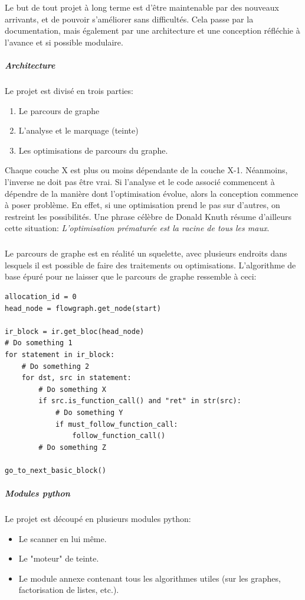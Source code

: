 Le but de tout projet à long terme est d'être maintenable par des nouveaux arrivants, et de pouvoir s'améliorer
sans difficultés. Cela passe par la documentation, mais également par une architecture et une conception réfléchie à l'avance
et si possible modulaire.
\subparagraph{Architecture}
Le projet est divisé en trois parties:
\begin{enumerate}
        \item Le parcours de graphe
        \item L'analyse et le marquage (teinte)
        \item Les optimisations de parcours du graphe.
\end{enumerate}
Chaque couche X est plus ou moins dépendante de la couche X-1. Néanmoins, l'inverse ne doit pas être vrai.
Si l'analyse et le code associé commencent à dépendre de la manière dont l'optimisation évolue, alors la conception commence à poser problème.
En effet, si une optimisation prend le pas sur d'autres, on restreint les possibilités. Une phrase célèbre de Donald Knuth résume d'ailleurs cette situation:
\textit{L'optimisation prématurée est la racine de tous les maux}.
\subparagraph{}
Le parcours de graphe est en réalité un squelette, avec plusieurs endroits dans lesquels il est possible de faire des traitements ou optimisations. L'algorithme de base
épuré pour ne laisser que le parcours de graphe ressemble à ceci:
\begin {lstlisting}[frame=single]
allocation_id = 0
head_node = flowgraph.get_node(start)

ir_block = ir.get_bloc(head_node)
# Do something 1
for statement in ir_block:
    # Do something 2
    for dst, src in statement:
        # Do something X
        if src.is_function_call() and "ret" in str(src):
            # Do something Y
            if must_follow_function_call:
                follow_function_call()
        # Do something Z

go_to_next_basic_block()
\end{lstlisting}

\subparagraph{Modules python}
Le projet est découpé en plusieurs modules python:
\begin{itemize}
        \item Le scanner en lui même.
        \item Le "moteur" de teinte.
        \item Le module annexe contenant tous les algorithmes utiles (sur les graphes, factorisation de listes, etc.).
\end{itemize}


